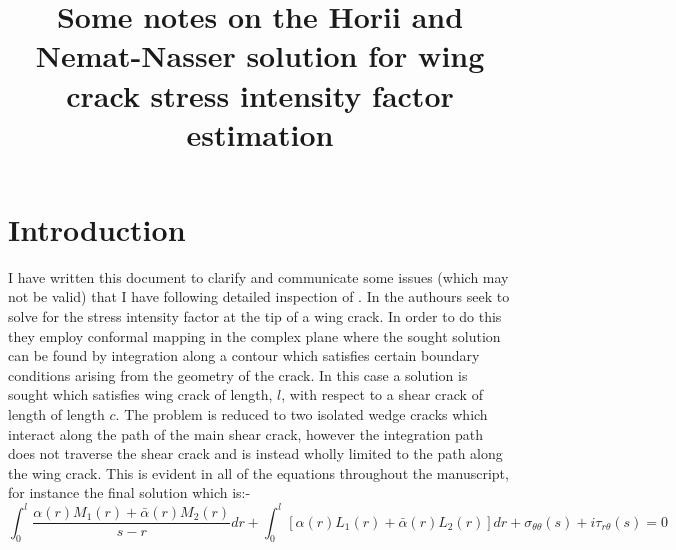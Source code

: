 \documentclass[12pt,a4paper,twoside]{article}
\title{Some notes on the Horii and Nemat-Nasser solution for wing crack stress intensity factor estimation}
\begin{document}
\maketitle
\section{Introduction}
I have written this document to clarify and communicate some issues (which may not be valid) that I have following detailed inspection of \citet{Horii1985}. 
In \citet{Horii1985} the authours seek to solve for the stress intensity factor at the tip of a wing crack.
In order to do this they employ conformal mapping in the complex plane where the sought solution can be found by integration along a contour which satisfies certain boundary conditions arising from the geometry of the crack. 
In this case a solution is sought which satisfies wing crack of length, $l$, with respect to a shear crack of length of length $c$.
The problem is reduced to two isolated wedge cracks which interact along the path of the main shear crack, however the integration path does not traverse the shear crack and is instead wholly limited to the path along the wing crack.
This is evident in all of the equations throughout the manuscript, for instance the final solution which is:-
\begin{equation}\label{eq:Singular solution}
\int_0^l\frac{\alpha(r)M_1(r) + \bar{\alpha}(r)M_2(r)}{s-r} dr+
\int_0^l\left[\alpha(r)L_1(r) + \bar{\alpha}(r)L_2(r)\right] dr+
\sigma_{\theta\theta}(s) + i\tau_{r\theta}(s) = 0
\end{equation}


\end{document}
